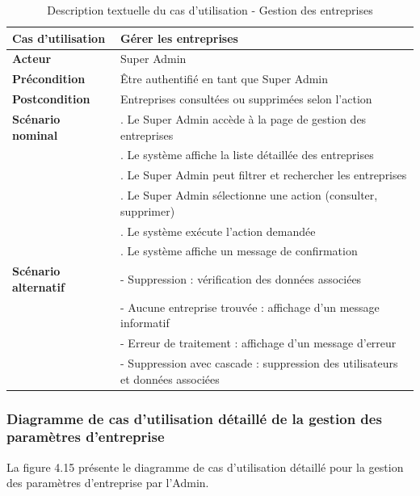 \begin{longtable}{|>{\raggedright\arraybackslash}p{4cm}|>{\raggedright\arraybackslash}p{9cm}|}
\caption{Description textuelle du cas d'utilisation - Gestion des entreprises}
\label{tab:manage_companies_usecase} \\
\hline
\textbf{Cas d'utilisation} & \textbf{Gérer les entreprises} \\
\hline
\textbf{Acteur} & Super Admin \\
\hline
\textbf{Précondition} & Être authentifié en tant que Super Admin \\
\hline
\textbf{Postcondition} & Entreprises consultées ou supprimées selon l'action \\
\hline
\textbf{Scénario nominal} & 
1. Le Super Admin accède à la page de gestion des entreprises \\
& 2. Le système affiche la liste détaillée des entreprises \\
& 3. Le Super Admin peut filtrer et rechercher les entreprises \\
& 4. Le Super Admin sélectionne une action (consulter, supprimer) \\
& 5. Le système exécute l'action demandée \\
& 6. Le système affiche un message de confirmation \\
\hline
\textbf{Scénario alternatif} & 
- Suppression : vérification des données associées \\
& - Aucune entreprise trouvée : affichage d'un message informatif \\
& - Erreur de traitement : affichage d'un message d'erreur \\
& - Suppression avec cascade : suppression des utilisateurs et données associées \\
\hline
\end{longtable}

\subsubsection{Diagramme de cas d'utilisation détaillé de la gestion des paramètres d'entreprise}
\noindent La figure 4.15 présente le diagramme de cas d'utilisation détaillé pour la gestion des paramètres d'entreprise par l'Admin.

